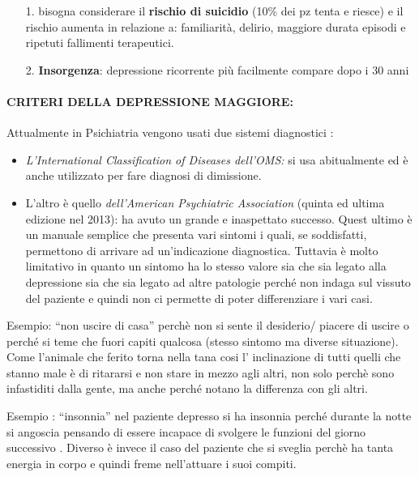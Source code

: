 \begin{itemize}
\item[1.]
  bisogna considerare il \textbf{rischio di suicidio} (10\% dei pz tenta
  e riesce) e il rischio aumenta in relazione a: familiarità, delirio,
  maggiore durata episodi e ripetuti fallimenti terapeutici.
\item[2.]
  \textbf{Insorgenza}: depressione ricorrente più facilmente compare
  dopo i 30 anni
\end{itemize}

\paragraph{CRITERI DELLA DEPRESSIONE MAGGIORE:}

Attualmente in Psichiatria vengono usati due sistemi diagnostici :

\begin{itemize}
\item
  \emph{\emph{L'International Classification of Diseases dell'OMS:}} si
  usa abitualmente ed è anche utilizzato per fare diagnosi di
  dimissione.
\item
  L'altro è quello \emph{\emph{dell'American Psychiatric Association}}
  (quinta ed ultima edizione nel 2013): ha avuto un grande e inaspettato
  successo. Quest ultimo è un manuale semplice che presenta vari sintomi
  i quali, se soddisfatti, permettono di arrivare ad un'indicazione
  diagnostica. Tuttavia è molto limitativo in quanto un sintomo ha lo
  stesso valore sia che sia legato alla depressione sia che sia legato
  ad altre patologie perché non indaga sul vissuto del paziente e quindi
  non ci permette di poter differenziare i vari casi.
\end{itemize}

Esempio: ``non uscire di casa'' perchè non si sente il desiderio/
piacere di uscire o perché si teme che fuori capiti qualcosa (stesso
sintomo ma diverse situazione). Come l'animale che ferito torna nella
tana cosi l' inclinazione di tutti quelli che stanno male è di ritararsi
e non stare in mezzo agli altri, non solo perchè sono infastiditi dalla
gente, ma anche perché notano la differenza con gli altri.

Esempio : ``insonnia'' nel paziente depresso si ha insonnia perché
durante la notte si angoscia pensando di essere incapace di svolgere le
funzioni del giorno successivo . Diverso è invece il caso del paziente
che si sveglia perchè ha tanta energia in corpo e quindi freme
nell'attuare i suoi compiti.

